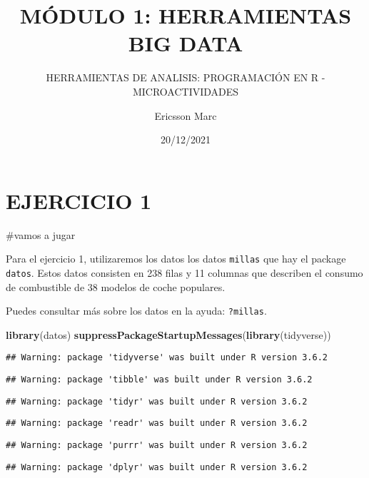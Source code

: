 \documentclass[]{article}
\title{MÓDULO 1: HERRAMIENTAS BIG DATA}
\subtitle{HERRAMIENTAS DE ANALISIS: PROGRAMACIÓN EN R - MICROACTIVIDADES}
\author{Ericsson Marc}
\date{20/12/2021}
\newenvironment{Shaded}{\begin{snugshade}}{\end{snugshade}}
\newcommand{\KeywordTok}[1]{\textcolor[rgb]{0.13,0.29,0.53}{\textbf{#1}}}
\newcommand{\NormalTok}[1]{#1}
\begin{document}
\maketitle

\hypertarget{ejercicio-1}{%
\section{EJERCICIO 1}\label{ejercicio-1}}

\#vamos a jugar

Para el ejercicio 1, utilizaremos los datos los datos \texttt{millas}
que hay el package \texttt{datos}. Estos datos consisten en 238 filas y
11 columnas que describen el consumo de combustible de 38 modelos de
coche populares.

Puedes consultar más sobre los datos en la ayuda: \texttt{?millas}.

\begin{Shaded}
\begin{Highlighting}[]
\KeywordTok{library}\NormalTok{(datos)}
\KeywordTok{suppressPackageStartupMessages}\NormalTok{(}\KeywordTok{library}\NormalTok{(tidyverse))}
\end{Highlighting}
\end{Shaded}

\begin{verbatim}
## Warning: package 'tidyverse' was built under R version 3.6.2
\end{verbatim}

\begin{verbatim}
## Warning: package 'tibble' was built under R version 3.6.2
\end{verbatim}

\begin{verbatim}
## Warning: package 'tidyr' was built under R version 3.6.2
\end{verbatim}

\begin{verbatim}
## Warning: package 'readr' was built under R version 3.6.2
\end{verbatim}

\begin{verbatim}
## Warning: package 'purrr' was built under R version 3.6.2
\end{verbatim}

\begin{verbatim}
## Warning: package 'dplyr' was built under R version 3.6.2
\end{verbatim}
\end{document}
